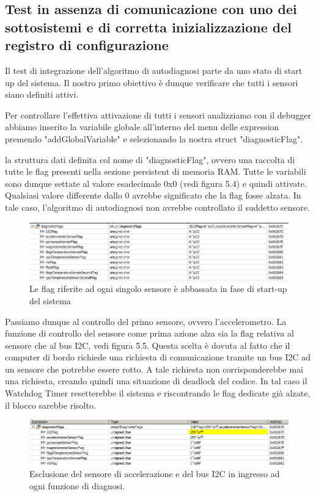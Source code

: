 \documentclass[LaM,binding=0.6cm,oneside]{../sapthesis}
\begin{document}
\subsection{Test in assenza di comunicazione con uno dei sottosistemi e di corretta inizializzazione
del registro di configurazione}
Il test di integrazione dell'algoritmo di autodiagnosi parte da uno stato di start up del sistema. Il nostro primo obiettivo è dunque verificare che tutti i sensori siano definiti attivi. 

Per controllare l'effettiva attivazione di tutti i sensori analizziamo con il debugger abbiamo inserito la variabile globale all'interno del menu delle expression premendo "addGlobalVariable" e selezionando la nostra struct "diagnosticFlag". 

la struttura dati definita col nome di "diagnosticFlag", ovvero una raccolta di tutte le flag presenti nella sezione persistent di memoria RAM. Tutte le variabili sono dunque settate al valore esadecimale 0x0 (vedi figura 5.4) e quindi attivate. Qualsiasi valore differente dallo 0 avrebbe significato che la flag fosse alzata. In tale caso, l'algoritmo di autodiagnosi non avrebbe controllato il suddetto sensore.
\begin{figure}[htbp]
\centerline{\includegraphics[scale=0.6]{examples/1_diagnosticFlagStart.JPG}}
\caption{Le flag riferite ad ogni singolo sensore è abbassata in fase di start-up del sistema}
\label{fig}
\end{figure}
\vspace{0.5cm}
Passiamo dunque al controllo del primo sensore, ovvero l'accelerometro. La funzione di controllo del sensore come prima azione alza sia la flag relativa al sensore che al bus I2C, vedi figura 5.5. Questa scelta è dovuta al fatto che il computer di bordo richiede una richiesta di comunicazione tramite un bus I2C ad un sensore che potrebbe essere rotto. A tale richiesta non corrisponderebbe mai una richiesta, creando quindi una situazione di deadlock del codice. 
In tal caso il Watchdog Timer resetterebbe il sistema e riscontrando le flag dedicate già alzate, il blocco sarebbe risolto.\newline
\begin{figure}[htbp]
\centerline{\includegraphics[scale=0.65]{examples/2_startAccelorometerCheck.JPG}}
\caption{Esclusione del sensore di accelerazione e del bus I2C in ingresso ad ogni funzione di diagnosi.}
\label{fig}
\end{figure}
\vspace{0.5cm}
\end{document}
